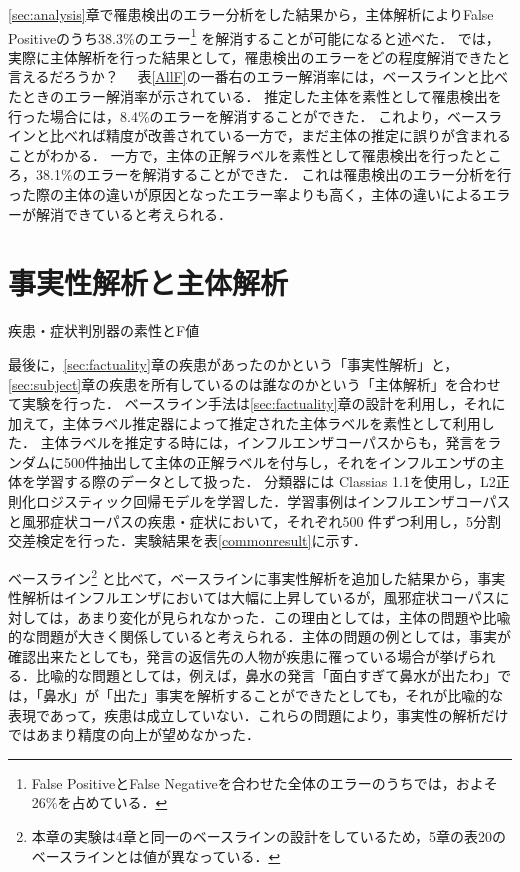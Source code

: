 \documentclass[japanese]{jnlp_1.4}
\begin{document}
\ref{sec:analysis}章で罹患検出のエラー分析をした結果から，主体解析によりFalse Positiveのうち38.3\%のエラー\footnote{False PositiveとFalse Negativeを合わせた全体のエラーのうちでは，およそ26\%を占めている．} を解消することが可能になると述べた．
では，実際に主体解析を行った結果として，罹患検出のエラーをどの程度解消できたと言えるだろうか？　
表\ref{AllF}の一番右のエラー解消率には，ベースラインと比べたときのエラー解消率が示されている．
推定した主体を素性として罹患検出を行った場合には，8.4\%のエラーを解消することができた．
これより，ベースラインと比べれば精度が改善されている一方で，まだ主体の推定に誤りが含まれることがわかる．
一方で，主体の正解ラベルを素性として罹患検出を行ったところ，38.1\%のエラーを解消することができた．
これは罹患検出のエラー分析を行った際の主体の違いが原因となったエラー率よりも高く，主体の違いによるエラーが解消できていると考えられる．






\section{事実性解析と主体解析}
\label{sec:factandsub}

\begin{table}[b]
\caption{疾患・症状判別器の素性とF値}
\label{commonresult}

\end{table}

最後に，\ref{sec:factuality}章の疾患があったのかという「事実性解析」と，\ref{sec:subject}章の疾患を所有しているのは誰なのかという「主体解析」を合わせて実験を行った．
ベースライン手法は\ref{sec:factuality}章の設計を利用し，それに加えて，主体ラベル推定器によって推定された主体ラベルを素性として利用した．
主体ラベルを推定する時には，インフルエンザコーパスからも，発言をランダムに500件抽出して主体の正解ラベルを付与し，それをインフルエンザの主体を学習する際のデータとして扱った．
分類器には Classias 1.1を使用し，L2正則化ロジスティック回帰モデルを学習した．学習事例はインフルエンザコーパスと風邪症状コーパスの疾患・症状において，それぞれ500 件ずつ利用し，5分割交差検定を行った．実験結果を表\ref{commonresult}に示す．


ベースライン\footnote{本章の実験は4章と同一のベースラインの設計をしているため，5章の表20のベースラインとは値が異なっている．}
と比べて，ベースラインに事実性解析を追加した結果から，事実性解析はインフルエンザにおいては大幅に上昇しているが，風邪症状コーパスに対しては，あまり変化が見られなかった．この理由としては，主体の問題や比喩的な問題が大きく関係していると考えられる．主体の問題の例としては，事実が確認出来たとしても，発言の返信先の人物が疾患に罹っている場合が挙げられる．比喩的な問題としては，例えば，鼻水の発言「面白すぎて鼻水が出たわ」では，「鼻水」が「出た」事実を解析することができたとしても，それが比喩的な表現であって，疾患は成立していない．これらの問題により，事実性の解析だけではあまり精度の向上が望めなかった．
\end{document}
